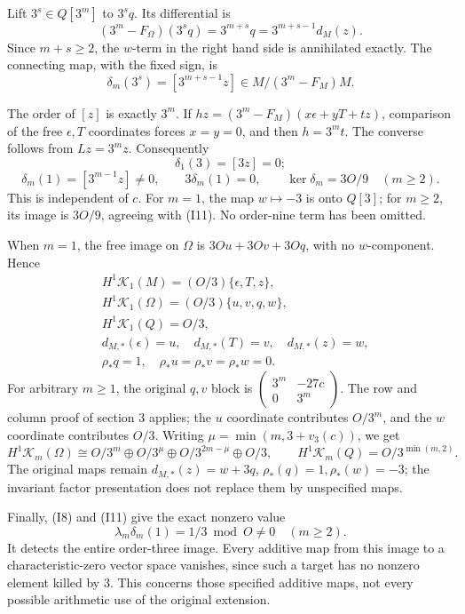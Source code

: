 \documentclass[
  10pt,
]{article}
\begin{document}
Lift \(3^s\in Q[3^m]\) to \(3^sq\). Its differential is \[
(3^m-F_\Omega)(3^sq)=3^{m+s}q
=3^{m+s-1}d_M(z).
\] Since \(m+s\ge2\), the \(w\)-term in the right hand side is
annihilated exactly. The connecting map, with the fixed sign, is \[
\delta_m(3^s)=[3^{m+s-1}z]\in M/(3^m-F_M)M. \tag{I10}
\]

The order of \([z]\) is exactly \(3^m\). If
\(hz=(3^m-F_M)(x\epsilon+yT+tz)\), comparison of the free \(\epsilon,T\)
coordinates forces \(x=y=0\), and then \(h=3^mt\). The converse follows
from \(Lz=3^mz\). Consequently \[
\delta_1(3)=[3z]=0;
\] \[
\delta_m(1)=[3^{m-1}z]\ne0,\qquad
3\delta_m(1)=0,\qquad
\ker\delta_m=3O/9\quad(m\ge2). \tag{I11}
\] This is independent of \(c\). For \(m=1\), the map \(w\mapsto-3\) is
onto \(Q[3]\); for \(m\ge2\), its image is \(3O/9\), agreeing with
(I11). No order-nine term has been omitted.

When \(m=1\), the free image on \(\Omega\) is \(3Ou+3Ov+3Oq\), with no
\(w\)-component. Hence \[
\begin{aligned}
&H^1\mathcal K_1(M)=(O/3)\{\epsilon,T,z\},\\
&H^1\mathcal K_1(\Omega)=(O/3)\{u,v,q,w\},\\
&H^1\mathcal K_1(Q)=O/3,\\
&d_{M,*}(\epsilon)=u,\quad d_{M,*}(T)=v,\quad d_{M,*}(z)=w,\\
&\rho_*q=1,\quad\rho_*u=\rho_*v=\rho_*w=0.
\end{aligned} \tag{I12}
\] For arbitrary \(m\ge1\), the original \(q,v\) block is
\(\left(\begin{smallmatrix}3^m&-27c\\0&3^m\end{smallmatrix}\right)\).
The row and column proof of section 3 applies; the \(u\) coordinate
contributes \(O/3^m\), and the \(w\) coordinate contributes \(O/3\).
Writing \(\mu=\min(m,3+v_3(c))\), we get \[
H^1\mathcal K_m(\Omega)\cong
O/3^m\oplus O/3^\mu\oplus O/3^{2m-\mu}\oplus O/3,\qquad
H^1\mathcal K_m(Q)=O/3^{\min(m,2)}. \tag{I13}
\] The original maps remain \(d_{M,*}(z)=w+3q\),
\(\rho_*(q)=1,\rho_*(w)=-3\); the invariant factor presentation does not
replace them by unspecified maps.

Finally, (I8) and (I11) give the exact nonzero value \[
\lambda_m\delta_m(1)=1/3\bmod O\ne0\quad(m\ge2). \tag{I14}
\] It detects the entire order-three image. Every additive map from this
image to a characteristic-zero vector space vanishes, since such a
target has no nonzero element killed by 3. This concerns those specified
additive maps, not every possible arithmetic use of the original
extension.
\end{document}
